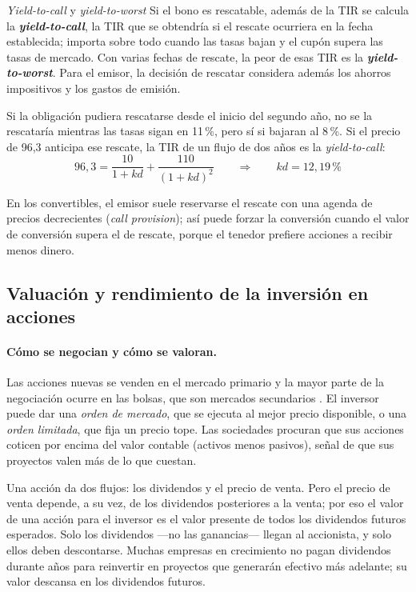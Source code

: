 \begin{definicion}{\emph{Yield-to-call} y \emph{yield-to-worst}}
Si el bono es rescatable, además de la TIR se calcula la \textbf{\emph{yield-to-call}}, la TIR que se obtendría si el rescate ocurriera en la fecha establecida; importa sobre todo cuando las tasas bajan y el cupón supera las tasas de mercado. Con varias fechas de rescate, la peor de esas TIR es la \textbf{\emph{yield-to-worst}}. Para el emisor, la decisión de rescatar considera además los ahorros impositivos y los gastos de emisión.
\end{definicion}

\begin{ejemplo}
Si la obligación pudiera rescatarse desde el inicio del segundo año, no se la rescataría mientras las tasas sigan en 11\,\%, pero sí si bajaran al 8\,\%. Si el precio de 96,3 anticipa ese rescate, la TIR de un flujo de dos años es la \emph{yield-to-call}:
\[
96{,}3 = \frac{10}{1+kd} + \frac{110}{(1+kd)^{2}}
\qquad\Longrightarrow\qquad kd = 12{,}19\,\%
\]
\end{ejemplo}

En los convertibles, el emisor suele reservarse el rescate con una agenda de precios decrecientes (\emph{call provision}); así puede forzar la conversión cuando el valor de conversión supera el de rescate, porque el tenedor prefiere acciones a recibir menos dinero.

\subsection{Valuación y rendimiento de la inversión en acciones}\label{sec:u4-acciones}

\paragraph{Cómo se negocian y cómo se valoran.} Las acciones nuevas se venden en el mercado primario y la mayor parte de la negociación ocurre en las bolsas, que son mercados secundarios . El inversor puede dar una \emph{orden de mercado}, que se ejecuta al mejor precio disponible, o una \emph{orden limitada}, que fija un precio tope. Las sociedades procuran que sus acciones coticen por encima del valor contable (activos menos pasivos), señal de que sus proyectos valen más de lo que cuestan.

Una acción da dos flujos: los dividendos y el precio de venta. Pero el precio de venta depende, a su vez, de los dividendos posteriores a la venta; por eso el valor de una acción para el inversor es el valor presente de todos los dividendos futuros esperados. Solo los dividendos —no las ganancias— llegan al accionista, y solo ellos deben descontarse. Muchas empresas en crecimiento no pagan dividendos durante años para reinvertir en proyectos que generarán efectivo más adelante; su valor descansa en los dividendos futuros.

